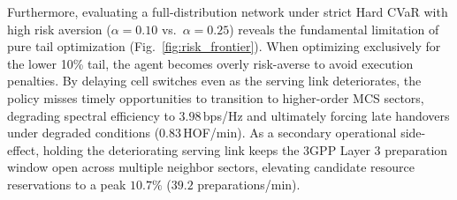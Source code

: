 \documentclass{ieeetmlcn}
\begin{document}
Furthermore, evaluating a full-distribution network under strict Hard CVaR with high risk aversion ($\alpha=0.10$ vs.\ $\alpha=0.25$) reveals the fundamental limitation of pure tail optimization (Fig.~\ref{fig:risk_frontier}). When optimizing exclusively for the lower 10\% tail, the agent becomes overly risk-averse to avoid execution penalties. By delaying cell switches even as the serving link deteriorates, the policy misses timely opportunities to transition to higher-order MCS sectors, degrading spectral efficiency to $3.98$\,bps/Hz and ultimately forcing late handovers under degraded conditions ($0.83$\,HOF/min). As a secondary operational side-effect, holding the deteriorating serving link keeps the 3GPP Layer 3 preparation window open across multiple neighbor sectors, elevating candidate resource reservations to a peak $10.7\%$ ($39.2$ preparations/min).

\begin{table}[htbp]
\centering
\caption{Tail-Risk ($\mathrm{CVaR}_{1\%}$) and Operational Performance Profile Across 1,000 Unseen Test Trajectories (Worst 1\% Tail Realizations). Bold indicates the best result; underline indicates the second-best.}
\label{tab:tail_risk}
\end{table}
\end{document}
